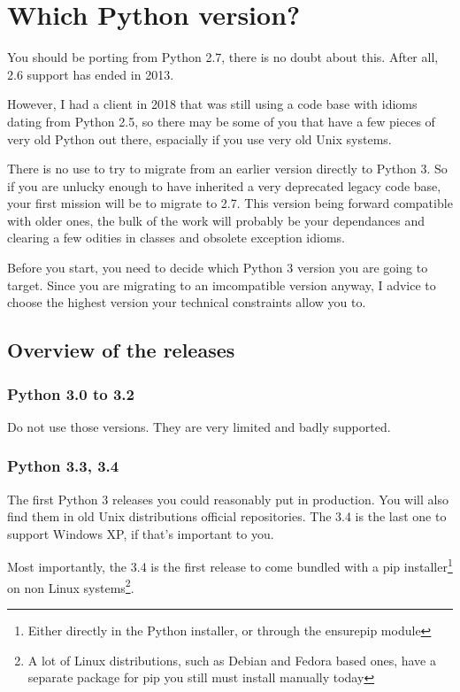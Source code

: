 \chapter{Which Python version?}

You should be porting from Python 2.7, there is no doubt about this. After all, 2.6 support has ended in 2013.

However, I had a client in 2018 that was still using a code base with idioms dating from Python 2.5, so there may be some of you that have a few pieces of very old Python out there, espacially if you use very old Unix systems.

There is no use to try to migrate from an earlier version directly to Python 3. So if you are unlucky enough to have inherited a very deprecated legacy code base, your first mission will be to migrate to 2.7. This version being forward compatible with older ones, the bulk of the work will probably be your dependances and clearing a few odities in classes and obsolete exception idioms.

Before you start, you need to decide which Python 3 version you are going to target. Since you are migrating to an imcompatible version anyway, I advice to choose the highest version your technical constraints allow you to.

\section{Overview of the releases}

\subsection{Python 3.0 to 3.2}

Do not use those versions. They are very limited and badly supported.

\subsection{Python 3.3, 3.4}

The first Python 3 releases you could reasonably put in production. You will also find them in old Unix distributions official repositories. The 3.4 is the last one to support Windows XP, if that's important to you.

Most importantly, the 3.4 is the first release to come bundled with a pip installer\footnote{Either directly in the Python installer, or through the ensurepip module} on non Linux systems\footnote{A lot of Linux distributions, such as Debian and Fedora based ones, have a separate package for pip you still must install manually today}.


